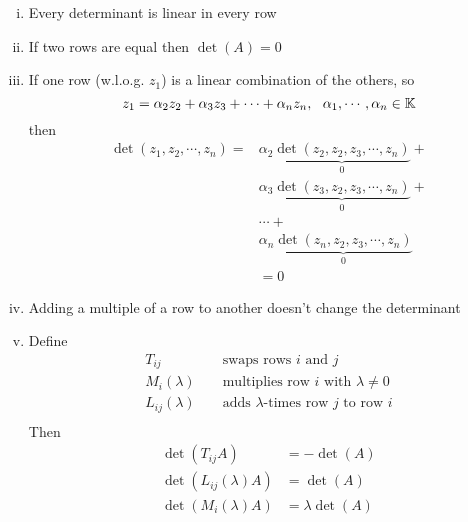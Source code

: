 \documentclass[../../script.tex]{subfiles}
\begin{document}
\begin{rem}
    \begin{enumerate}[(i)]
        \item Every determinant is linear in every row
        \item If two rows are equal then $\det(A) = 0$
        \item If one row (w.l.o.g. $z_1$) is a linear combination of the others, so 
        \[
            z_1 = \alpha_2z_2 + \alpha_3z_3 + \cdots + \alpha_nz_n, ~~\alpha_1, \cdots, \alpha_n \in \mathbb{K}  
        \]
        then
        \begin{align*}
            \det(z_1, z_2, \cdots, z_n) = &\alpha_2 \underbrace{\det(z_2, z_2, z_3, \cdots, z_n)}_0 + \\
            &\alpha_3 \underbrace{\det(z_3, z_2, z_3, \cdots, z_n)}_0 + \\
            &\cdots + \\
            &\alpha_n \underbrace{\det(z_n, z_2, z_3, \cdots, z_n)}_0 \\
            &= 0
        \end{align*}

        \item Adding a multiple of a row to another doesn't change the determinant
    
        \item Define 
        \begin{align*}
            T_{ij} && \text{ swaps rows } i \text{ and } j \\
            M_i(\lambda) && \text{ multiplies row } i \text{ with } \lambda \ne 0 \\
            L_{ij}(\lambda) && \text{ adds } \lambda \text{-times row } j \text{ to row } i \\
        \end{align*}
        Then 
        \begin{align*}
            \det(T_{ij} A) &= -\det(A) \\
            \det(L_{ij}(\lambda) A) &= \det(A) \\
            \det(M_i(\lambda) A) &= \lambda\det(A)
        \end{align*}
    \end{enumerate}
\end{rem}
\end{document}
